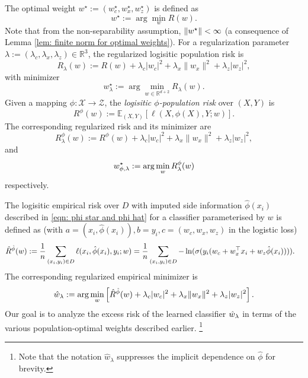 The optimal weight $ w^\star := (w^\star_c, w^\star_x, w^\star_z) $ is defined as
\begin{equation}\label{eqn: w star}
    w^\star := \arg\min_w R(w).
\end{equation}
Note that from the non-separability assumption, $\|w^\star\| < \infty$ (a consequence of Lemma \ref{lem: finite norm for optimal weights}).
For a regularization parameter $ \lambda := (\lambda_c, \lambda_x, \lambda_z) \in \mathbb{R}^{3} $, the regularized logisitic population risk is
\begin{equation*}
    R_\lambda(w) := R(w) + \lambda_c |w_c|^2 + \lambda_x \|w_x\|^2 + \lambda_z |w_z|^2,
\end{equation*}
with minimizer
\begin{equation}\label{eqn: w lambda star}
    w^\star_\lambda := \arg\min_{w \in \mathbb{R}^{d+2}} R_\lambda(w).
\end{equation}
Given a mapping $ \phi: \mathcal{X} \rightarrow \mathcal{Z} $, the \textit{logisitic $\phi$-population risk} over $ (X,Y) $ is
\begin{equation*}
    R^\phi(w) := \mathbb{E}_{(X, Y)}[\ell(X,\phi(X),Y; w)].
\end{equation*}
The corresponding regularized risk and its minimizer are
\begin{equation}\label{eqn: risk phi eta}
    R^\phi_\lambda(w) := R^\phi(w) + \lambda_c |w_c|^2 + \lambda_x \|w_x\|^2 + \lambda_z |w_z|^2,
\end{equation}
and
\begin{equation}\label{eqn: w star phi lambda}
   w^\star_{\phi,\lambda} := \arg\min_w R^{\phi}_\lambda(w)
\end{equation}
respectively.

\noindent The logisitic empirical risk over $ D $ with imputed side information $ \hat{\phi}(x_i) $ described in \eqref{eqn: phi star and phi hat} for a classifier parameterised by $w$ is defined as (with $a = (x_i,\hat{\phi}(x_i)), b= y_i, c = (w_c, w_x, w_z)$ in the logistic loss)
\begin{equation*}
\begin{aligned}
    \hat{R}^{\hat{\phi}}(w) &:= \frac{1}{n} \sum_{(x_i, y_i) \in D} \ell(x_i, \hat{\phi}(x_i), y_i; w) = \frac{1}{n} \sum_{(x_i, y_i) \in D} -\ln(\sigma(y_i(w_c + w_x^\top x_i + w_z \hat{\phi}(x_i)))).
\end{aligned}
\end{equation*}
The corresponding regularized empirical minimizer is
\begin{equation}\label{eqn: w hat lambda}
    \hat{w}_\lambda := \arg\min_w \left[ \hat{R}^{\hat{\phi}}(w) + \lambda_c |w_c|^2 + \lambda_x \|w_x\|^2 + \lambda_z |w_z|^2 \right].
\end{equation}
Our goal is to analyze the excess risk of the learned classifier $\hat{w}_\lambda$ in terms of the various population-optimal weights described earlier. \footnote{Note that the notation $\hat{w}_{\lambda}$ suppresses the implicit dependence on $\hat{\phi}$ for brevity.}




